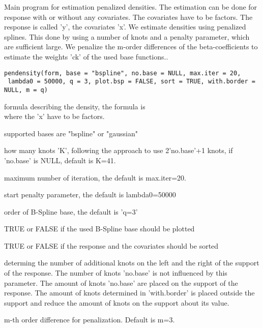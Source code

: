 \begin{Description}\relax
Main program for estimation penalized densities. The estimation can be done for response with or without any covariates. The covariates have to be factors. The response is called 'y', the covariates 'x'. We estimate densities using penalized splines. This done by using a number of knots and a penalty parameter, which are sufficient large. We penalize the m-order differences of the beta-coefficients to estimate the weights 'ck' of the used base functions..
\end{Description}
\begin{Usage}
\begin{verbatim}
pendensity(form, base = "bspline", no.base = NULL, max.iter = 20,
 lambda0 = 50000, q = 3, plot.bsp = FALSE, sort = TRUE, with.border = NULL, m = q)
\end{verbatim}
\end{Usage}
\begin{Arguments}
\begin{ldescription}
\item[\code{form}] formula describing the density, the formula is\\
where the 'x' have to be factors.
\item[\code{base}] supported bases are "bspline" or "gaussian"
\item[\code{no.base}] how many knots 'K', following the approach to use 2'no.base'+1 knots, if 'no.base' is NULL, default is K=41.
\item[\code{max.iter}] maximum number of iteration, the default is max.iter=20.
\item[\code{lambda0}] start penalty parameter, the default is lambda0=50000
\item[\code{q}] order of B-Spline base, the default is 'q=3'
\item[\code{plot.bsp}] TRUE or FALSE if the used B-Spline base should be plotted
\item[\code{sort}] TRUE or FALSE if the response and the covariates should be sorted
\item[\code{with.border}] determing the number of additional knots on the left and the right of the support of the response. The number of knots 'no.base' is not influenced by this parameter. The amount of knots 'no.base' are placed on the support of the response. The amount of knots determined in 'with.border' is placed outside the support and reduce the amount of knots on the support about its value.
\item[\code{m}] m-th order difference for penalization. Default is m=3.
\end{ldescription}
\end{Arguments}
